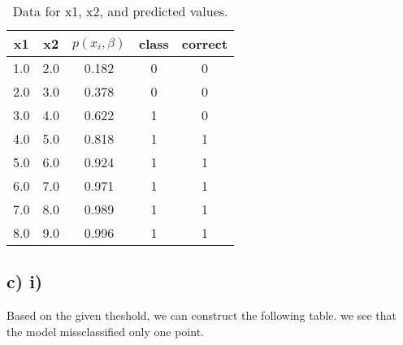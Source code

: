\documentclass{article}
\begin{document}
\begin{table}[h!]
  \centering
  \caption{
    Data for x1, x2, and predicted values.
  }
  \begin{tabular}{ccccc}
    \toprule
    \textbf{x1} & \textbf{x2} & \textbf{$p(x_i, \beta)$} & \textbf{class} & \textbf{correct}\\
    \midrule
    1.0 & 2.0 & 0.182 & 0 & 0\\
    2.0 & 3.0 & 0.378 & 0 & 0\\
    3.0 & 4.0 & 0.622 & 1 & 0\\
    4.0 & 5.0 & 0.818 & 1 & 1\\
    5.0 & 6.0 & 0.924 & 1 & 1\\
    6.0 & 7.0 & 0.971 & 1 & 1\\
    7.0 & 8.0 & 0.989 & 1 & 1\\
    8.0 & 9.0 & 0.996 & 1 & 1\\
    \bottomrule
  \end{tabular}
  \label{tab:x1_x2_pred_data}
\end{table}

\subsection*{c) i)} 
Based on the given theshold, we can construct the following table. we see that the model missclassified only one point.

\clearpage
 
% 
% 

\end{document}
